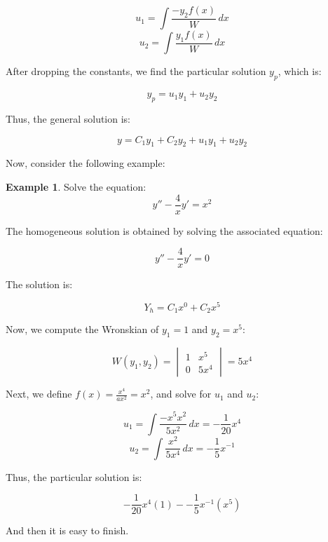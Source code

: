 \documentclass{article}
\theoremstyle{definition}
\newtheorem{example}{Example}[section]
\begin{document}
\[
u_1 = \int \frac{-y_2 f(x)}{W} \, dx
\]
\[
u_2 = \int \frac{y_1 f(x)}{W} \, dx
\]

After dropping the constants, we find the particular solution \( y_p \), which is:

\[
y_p = u_1 y_1 + u_2 y_2
\]

Thus, the general solution is:

\[
y = C_1 y_1 + C_2 y_2 + u_1 y_1 + u_2 y_2
\]

Now, consider the following example:

\begin{example}
Solve the equation:
\[
y'' - \frac{4}{x}y' = x^2
\]

The homogeneous solution is obtained by solving the associated equation:

\[
y'' - \frac{4}{x}y' = 0
\]

The solution is:

\[
Y_h = C_1 x^0 + C_2 x^{5}
\]

Now, we compute the Wronskian of \( y_1 = 1 \) and \( y_2 = x^{5} \):

\[
W(y_1, y_2) = 
\begin{vmatrix}
1 & x^{5} \\
0 & 5x^4
\end{vmatrix}
= 5x^4
\]

Next, we define \( f(x) = \frac{x^4}{ax^2} = x^2 \), and solve for \( u_1 \) and \( u_2 \):

\[
u_1 = \int \frac{-x^{5} x^2}{5x^2} \, dx = -\frac{1}{20}x^4
\]
\[
u_2 = \int \frac{x^2}{5x^4} \, dx = -\frac{1}{5}x^{-1}
\]

Thus, the particular solution is:

\[
    -\frac{1}{20}x^4(1) - -\frac{1}{5}x^{-1}(x^5)
\]

And then it is easy to finish. 
\end{example}
\end{document}
